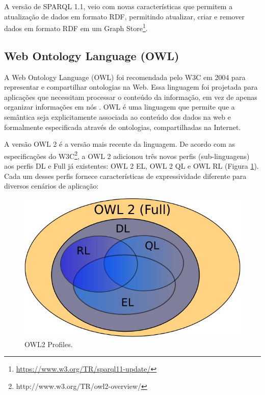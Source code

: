 %
A versão de SPARQL 1.1, veio com novas características que permitem
a atualização de dados em formato \foreignlanguage{english}{RDF},
permitindo atualizar, criar e remover dados em formato \foreignlanguage{english}{RDF}
em um \foreignlanguage{english}{Graph Store}\footnote{\url{https://www.w3.org/TR/sparql11-update/}}.
%

\subsection*{Web Ontology Language\foreignlanguage{brazil}{ (}OWL\foreignlanguage{brazil}{)}}

%
A \foreignlanguage{english}{Web Ontology Language} (\foreignlanguage{english}{OWL})
foi recomendada pelo W3C em 2004 para representar e compartilhar ontologias
na Web. Essa linguagem foi projetada para aplicações que necessitam
processar o conteúdo da informação, em vez de apenas organizar informações
em nós \citep{mcguinness2004owl}. \foreignlanguage{english}{OWL}
é uma linguagem que permite que a semântica seja explicitamente associada
ao conteúdo dos dados na web e formalmente especificada através de
ontologias, compartilhadas na Internet. 

A versão \foreignlanguage{english}{OWL} 2 é a versão mais recente
da linguagem. De acordo com as especificações do W3C\footnote{http://www.w3.org/TR/owl2-overview/},
a \foreignlanguage{english}{OWL 2} adicionou três novos perfis (\foreignlanguage{english}{sub-linguagens})
aos perfis DL e \foreignlanguage{english}{Full} já existentes: \foreignlanguage{english}{OWL
2} EL,\foreignlanguage{english}{ OWL 2 QL} e \foreignlanguage{english}{OWL
RL} (Figura \ref{fig:OWL2-Profiles}). Cada um desses perfis fornece
características de expressividade diferente para diversos cenários
de aplicação:

\begin{figure}[H]
\begin{centering}
\includegraphics[width=0.6\columnwidth]{figures/owl2Profiles}
\par\end{centering}
\caption{OWL2 Profiles.\label{fig:OWL2-Profiles}}
\end{figure}

